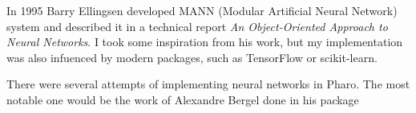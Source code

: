 In 1995 Barry Ellingsen developed MANN (Modular Artificial Neural Network) system and described it in a technical report \textit{An Object-Oriented Approach to Neural Networks}\cite{Ellingsen-1995}. I took some inspiration from his work, but my implementation was also infuenced by modern packages, such as TensorFlow or scikit-learn.

There were several attempts of implementing neural networks in Pharo. The most notable one would be the work of Alexandre Bergel done in his package
